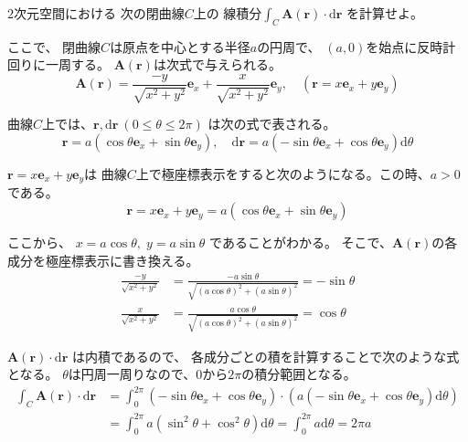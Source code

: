 \documentclass[12pt,b5paper]{ltjsarticle}
\begin{document}
\hrulefill

$2$次元空間における
次の閉曲線$C$上の
線積分$\displaystyle \int_{C} \bm{A}(\bm{r})\cdot \mathrm{d}\bm{r}$
を計算せよ。

ここで、
閉曲線$C$は原点を中心とする半径$a$の円周で、
$(a,0)$を始点に反時計回りに一周する。
$\bm{A}(\bm{r})$は次式で与えられる。
\begin{equation}
 \bm{A}(\bm{r})
  =\frac{-y}{\sqrt{x^{2}+y^{2}}}\bm{e}_{x}
  +\frac{x}{\sqrt{x^{2}+y^{2}}}\bm{e}_{y}
  ,\quad
  (\bm{r}=x\bm{e}_{x}+y\bm{e}_{y})
\end{equation}

曲線$C$上では、$\bm{r},\mathrm{d}\bm{r} \: (0\leq \theta \leq 2\pi)$
は次の式で表される。
\begin{equation}
 \bm{r}=a(\cos{\theta}\bm{e}_{x}+\sin{\theta}\bm{e}_{y}),\quad
 \mathrm{d}\bm{r}=a(-\sin{\theta}\bm{e}_{x}+\cos{\theta}\bm{e}_{y})\mathrm{d}\theta
\end{equation}

\hrulefill

$\bm{r}=x\bm{e}_{x}+y\bm{e}_{y}$は
曲線$C$上で極座標表示をすると次のようになる。この時、$a>0$である。
\begin{equation}
 \bm{r}=x\bm{e}_{x}+y\bm{e}_{y}
 = a(\cos{\theta}\bm{e}_{x}+\sin{\theta}\bm{e}_{y})
\end{equation}

ここから、
$x=a\cos{\theta}, \; y=a\sin{\theta}$
であることがわかる。
そこで、$\bm{A}(\bm{r})$の各成分を極座標表示に書き換える。
\begin{align}
 \frac{-y}{\sqrt{x^{2}+y^{2}}}
 &=\frac{-a\sin{\theta}}{\sqrt{(a\cos{\theta})^{2}+(a\sin{\theta})^{2}}}
 =-\sin{\theta}\\
%
  \frac{x}{\sqrt{x^{2}+y^{2}}}
 &=
  \frac{a\cos{\theta}}{\sqrt{(a\cos{\theta})^{2}+(a\sin{\theta})^{2}}}
 =\cos{\theta}
\end{align}

$\bm{A}(\bm{r})\cdot \mathrm{d}\bm{r}$
は内積であるので、
各成分ごとの積を計算することで次のような式となる。
$\theta$は円周一周りなので、$0$から$2\pi$の積分範囲となる。
\begin{align}
 \int_{C} \bm{A}(\bm{r})\cdot \mathrm{d}\bm{r}
  &=
  \int_{0}^{2\pi} (-\sin{\theta}\bm{e}_{x}+\cos{\theta}\bm{e}_{y})
  \cdot
(a(-\sin{\theta}\bm{e}_{x}+\cos{\theta}\bm{e}_{y})\mathrm{d}\theta)\\
  &= \int_{0}^{2\pi} a(\sin^{2}{\theta}+\cos^{2}{\theta})\mathrm{d}\theta
  = \int_{0}^{2\pi} a\mathrm{d}\theta
  = 2\pi a
\end{align}



\hrulefill
\end{document}
